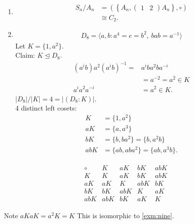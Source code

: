 \begin{example}
~

\begin{enumerate}
\def\labelenumi{\roman{enumi}.}
\item
  \begin{align*}
    S_n / A_n &= \left( \left\{ A_n, \begin{pmatrix}1 & 2\end{pmatrix} A_n \right\}, \circ \right) \\
    &\cong C_2.
  \end{align*}
\item
  \begin{align*}
  D_8 = \langle a, b : a^4 = e = b^2,\ bab = a^{-1} \rangle
  \end{align*}
  Let \(K = \{1, a^2 \}\).\\
  Claim: \(K \trianglelefteq D_8\).
  \begin{align*}
  (a^i b) a^2 (a^i b)^{-1} =& a^i b a^2 b a^{-i} \\
  &= a^{-2} = a^2 \in K \\
  a^i a^2 a^{-i} &= a^2 \in K.
  \end{align*}
  \(|D_8| / |K| = 4 = |(D_8 : K)|\).\\
  4 distinct left cosets:
  \begin{align*}
  K &= \{ 1, a^2 \} \\
  aK &= \{ a, a^3 \} \\
  bK &= \{ b, ba^2 \} = \{ b, a^2 b \} \\
  abK &= \{ ab, aba^2 \} = \{ ab, a^3 b \}.
  \end{align*}
\end{enumerate}

\begin{align*}
    \begin{array}{c|cccc}
        \circ & K & aK & bK & abK \\
        \hline
        K   & K   & aK   & bK  & abK \\
        aK  & aK  & K & abK & bK  \\
        bK  & bK  & abK  & K   & aK  \\
        abK & abK & bK   & aK  & K
    \end{array} 
\end{align*}

Note \(aK aK = a^2 K = K\)
This is isomorphic to \ref{exm:nine}.


\end{example}
